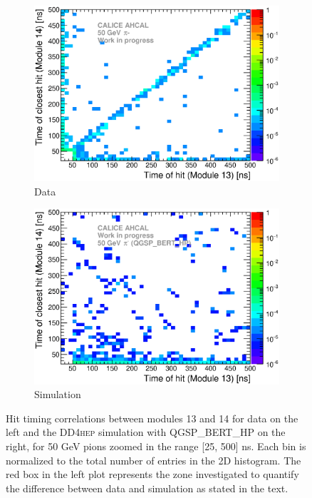\documentclass[12pt]{article}
\newcommand\ddhep{\textsc{DD4hep}\xspace}
\begin{document}
\begin{figure}[htbp!]
  \begin{subfigure}[t]{0.49\textwidth}
    \centering
    \includegraphics[width=1\textwidth]{../../Draft/fig/Time_Correlation_long_Zoom.eps}
    \caption{Data} \label{fig:TimeCorr_Data_long_50GeV_Zoom}
  \end{subfigure}
  \hfill
  \begin{subfigure}[t]{0.49\textwidth}
    \centering
    \includegraphics[width=1\textwidth]{../../Draft/fig/Time_Correlation_50GeV_long_QGSPBERTHP_DD4hep_Zoom.eps}
    \caption{Simulation} \label{fig:TimeCorr_Data_long_50GeV_Sim_Zoom}
  \end{subfigure}
  \caption{Hit timing correlations between modules 13 and 14 for data on the left and the \ddhep simulation with QGSP\_BERT\_HP on the right, for 50 GeV pions zoomed in the range [25, 500] ns. Each bin is normalized to the total number of entries in the 2D histogram. The red box in the left plot represents the zone investigated to quantify the difference between data and simulation as stated in the text.}
  \label{fig:TimeCorr_long_50GeV_Zoom}
\end{figure}
\end{document}
